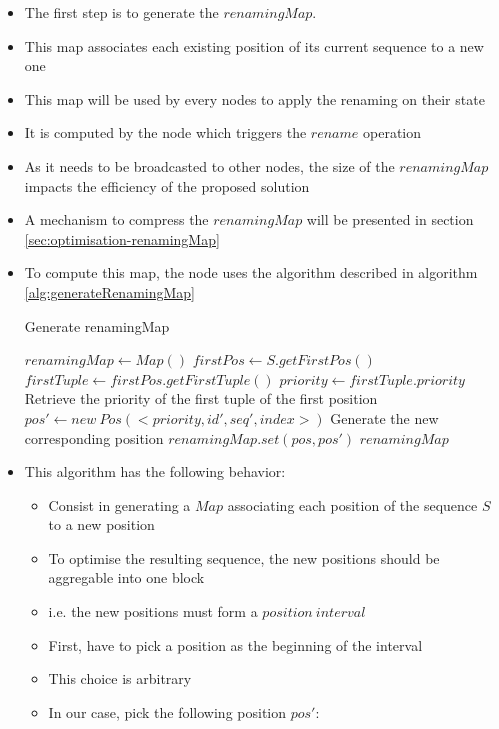 \documentclass{article}
\begin{document}
\begin{itemize}
    \item The first step is to generate the $renamingMap$.
    \item This map associates each existing position of its current sequence to a new one
    \item This map will be used by every nodes to apply the renaming on their state
    \item It is computed by the node which triggers the $rename$ operation
    \item As it needs to be broadcasted to other nodes, the size of the $renamingMap$ impacts the efficiency of the proposed solution
    \item A mechanism to compress the $renamingMap$ will be  presented in section \ref{sec:optimisation-renamingMap}
    \item To compute this map, the node uses the algorithm described in algorithm \ref{alg:generateRenamingMap}

    \begin{algorithm}
        \caption{Generate renamingMap}
        \label{alg:generateRenamingMap}
        \begin{algorithmic}
            \State $renamingMap \gets Map()$
            \State
            \State $firstPos \gets S.getFirstPos()$
            \State $firstTuple \gets firstPos.getFirstTuple()$
            \State $priority \gets firstTuple.priority$
            \Comment Retrieve the priority of the first tuple of the first position
            \State
                \State $pos' \gets new \ Pos(<priority, id', seq', index>)$
                \Comment Generate the new corresponding position
                \State $renamingMap.set(pos, pos')$
            \EndFor
            \State
            \State \Return $renamingMap$
        \EndFunction
        \end{algorithmic}
    \end{algorithm}

    \item This algorithm has the following behavior:
    \begin{itemize}
        \item Consist in generating a $Map$ associating each position of the sequence $S$ to a new position
        \item To optimise the resulting sequence, the new positions should be aggregable into one block
        \item i.e. the new positions must form a $position \ interval$
        \item First, have to pick a position as the beginning of the interval
        \item This choice is arbitrary
        \item In our case, pick the following position $pos'$:


\end{itemize}
\end{itemize}
\end{document}
